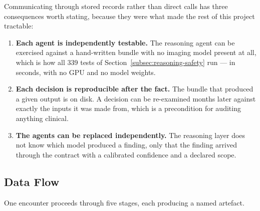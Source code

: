 Communicating through stored records rather than direct calls has three consequences worth
stating, because they were what made the rest of this project tractable:

\begin{enumerate}
  \item \textbf{Each agent is independently testable.} The reasoning agent can be exercised
        against a hand-written bundle with no imaging model present at all, which is how all
        339 tests of Section~\ref{subsec:reasoning-safety} run --- in seconds, with no GPU and
        no model weights.
  \item \textbf{Each decision is reproducible after the fact.} The bundle that produced a given
        output is on disk. A decision can be re-examined months later against exactly the inputs
        it was made from, which is a precondition for auditing anything clinical.
  \item \textbf{The agents can be replaced independently.} The reasoning layer does not know
        which model produced a finding, only that the finding arrived through the contract with
        a calibrated confidence and a declared scope.
\end{enumerate}

\subsection{Data Flow}
\label{subsec:integration-flow}

One encounter proceeds through five stages, each producing a named artefact.

